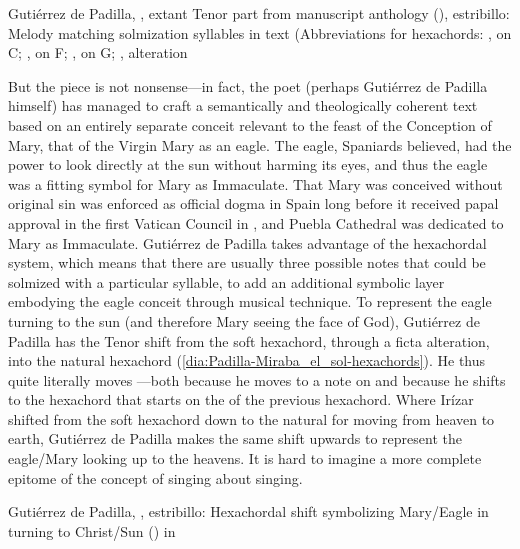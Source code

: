 {Gutiérrez de Padilla, , extant Tenor part from
manuscript anthology (), estribillo: Melody matching
solmization syllables in text (Abbreviations for hexachords: ,
 on C; ,  on F; , 
on G; ,  alteration}

But the piece is not nonsense---in fact, the poet (perhaps Gutiérrez de Padilla
himself) has managed to craft a semantically and theologically coherent text
based on an entirely separate conceit relevant to the feast of the Conception
of Mary, that of the Virgin Mary as an eagle.
The eagle, Spaniards believed, had the power to look directly at the sun
without harming its eyes, and thus the eagle was a fitting symbol for Mary as
Immaculate.%
That Mary was conceived without original sin was enforced as official dogma in
Spain long before it received papal approval in the first Vatican Council in
\XXX[18XX], and Puebla Cathedral was dedicated to Mary as Immaculate.
Gutiérrez de Padilla takes advantage of the hexachordal system, which means
that there are usually three possible notes that could be solmized with a
particular syllable, to add an additional symbolic layer embodying the eagle
conceit through musical technique.
To represent the eagle turning to the sun (and therefore Mary seeing the face
of God\XXX[?]), Gutiérrez de Padilla has the Tenor shift from the soft
hexachord, through a ficta alteration, into the natural hexachord
(\cref{dia:Padilla-Miraba_el_sol-hexachords}).
He thus quite literally moves ---both because he moves to a
note on  and because he shifts to the hexachord that starts on the
 of the previous hexachord.
Where Irízar shifted from the soft hexachord down to the natural for moving from
heaven to earth, Gutiérrez de Padilla makes the same shift upwards to represent
the eagle/Mary looking up to the heavens.
It is hard to imagine a more complete epitome of the concept of singing about
singing.

{Gutiérrez de Padilla, , estribillo: Hexachordal shift
symbolizing Mary/Eagle in  turning to
Christ/Sun () in }

